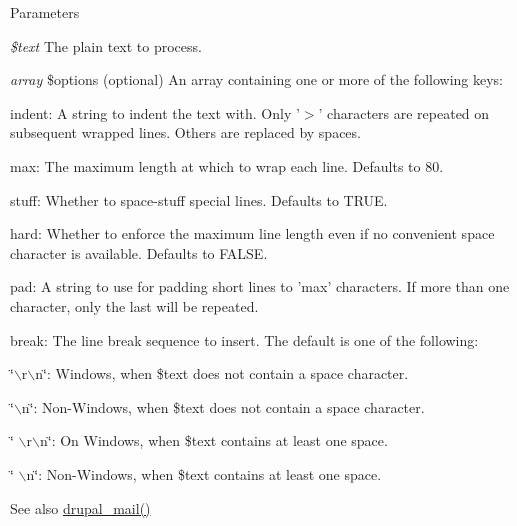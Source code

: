 \begin{DoxyParams}{Parameters}
\item[{\em \$text}]The plain text to process. \item[{\em array}]\$options (optional) An array containing one or more of the following keys:
\begin{DoxyItemize}
\item indent: A string to indent the text with. Only '$>$' characters are repeated on subsequent wrapped lines. Others are replaced by spaces.
\item max: The maximum length at which to wrap each line. Defaults to 80.
\item stuff: Whether to space-\/stuff special lines. Defaults to TRUE.
\item hard: Whether to enforce the maximum line length even if no convenient space character is available. Defaults to FALSE.
\item pad: A string to use for padding short lines to 'max' characters. If more than one character, only the last will be repeated.
\item break: The line break sequence to insert. The default is one of the following:
\begin{DoxyItemize}
\item \char`\"{}$\backslash$r$\backslash$n\char`\"{}: Windows, when \$text does not contain a space character.
\item \char`\"{}$\backslash$n\char`\"{}: Non-\/Windows, when \$text does not contain a space character.
\item \char`\"{} $\backslash$r$\backslash$n\char`\"{}: On Windows, when \$text contains at least one space.
\item \char`\"{} $\backslash$n\char`\"{}: Non-\/Windows, when \$text contains at least one space.
\end{DoxyItemize}
\end{DoxyItemize}\end{DoxyParams}
\begin{DoxySeeAlso}{See also}
\hyperlink{mail_8inc_ab80781fd7273975a77cbbd13300eddbf}{drupal\_\-mail()} 
\end{DoxySeeAlso}
